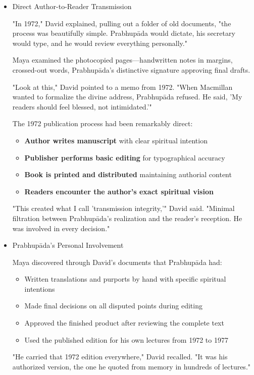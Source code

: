 \documentclass[11pt,twoside]{book}
\begin{document}
\begin{itemize}
\item Direct Author-to-Reader Transmission
\label{sec:org33c5a3e}

"In 1972," David explained, pulling out a folder of old documents, "the process was beautifully simple. Prabhupāda would dictate, his secretary would type, and he would review everything personally."

Maya examined the photocopied pages—handwritten notes in margins, crossed-out words, Prabhupāda's distinctive signature approving final drafts.

"Look at this," David pointed to a memo from 1972. "When Macmillan wanted to formalize the divine address, Prabhupāda refused. He said, 'My readers should feel blessed, not intimidated.'"

The 1972 publication process had been remarkably direct:
\begin{itemize}
\item \textbf{\textbf{Author writes manuscript}} with clear spiritual intention
\item \textbf{\textbf{Publisher performs basic editing}} for typographical accuracy
\item \textbf{\textbf{Book is printed and distributed}} maintaining authorial content
\item \textbf{\textbf{Readers encounter the author's exact spiritual vision}}
\end{itemize}

"This created what I call 'transmission integrity,'" David said. "Minimal filtration between Prabhupāda's realization and the reader's reception. He was involved in every decision."
\item Prabhupāda's Personal Involvement
\label{sec:org5ff6740}

Maya discovered through David's documents that Prabhupāda had:
\begin{itemize}
\item Written translations and purports by hand with specific spiritual intentions
\item Made final decisions on all disputed points during editing
\item Approved the finished product after reviewing the complete text
\item Used the published edition for his own lectures from 1972 to 1977
\end{itemize}

"He carried that 1972 edition everywhere," David recalled. "It was his authorized version, the one he quoted from memory in hundreds of lectures."
\end{itemize}
\end{document}
